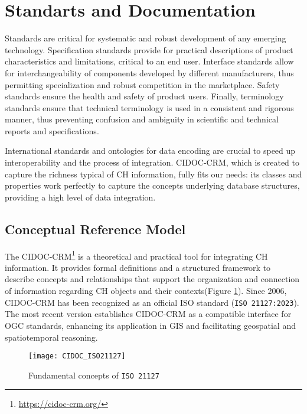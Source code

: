 \section{Standarts and Documentation} 
\label{sub:standart}

Standards are critical for systematic and robust development of any emerging technology. 
Specification standards provide for practical descriptions of product characteristics and limitations, 
critical to an end user. Interface standards allow for interchangeability of components developed by 
different manufacturers, thus permitting specialization and robust competition in the marketplace. 
Safety standards ensure the health and safety of product users. Finally, terminology standards ensure that 
technical terminology is used in a consistent and rigorous manner, thus preventing confusion and 
ambiguity in scientific and technical reports and specifications.
~\cite{hale2014handbook}

International standards and ontologies for data encoding are crucial
to speed up interoperability and the process of integration. \gls{CIDOC-CRM}, which is created to capture the richness typical of CH
information, fully fits our needs: its classes and properties
work perfectly to capture the concepts underlying database structures, providing a high level of data integration.
~\cite{eide2008encoding}



\subsection{ Conceptual Reference Model} 
\label{sec:cidoc}


The \gls{CIDOC-CRM}\footnote{\url{https://cidoc-crm.org/}} is a theoretical and practical tool for integrating \gls{CH} information. It provides formal definitions and a structured framework to describe concepts and relationships that support the organization and connection of information regarding \gls{CH} objects and their contexts(Figure \ref{fig:cidoc}).
Since 2006, \gls{CIDOC-CRM} has been recognized as an official ISO standard (\texttt{ISO 21127:2023}). The most recent version establishes \gls{CIDOC-CRM} as a compatible interface for \gls{OGC} standards, enhancing its application in \gls{GIS} and facilitating geospatial and spatiotemporal reasoning.


\begin{figure}[h!]
    \centering
    \texttt{[image: CIDOC\_ISO21127]}
    \caption{Fundamental concepts of \texttt{ISO 21127} ~\cite{doerr2007cidoc}}
    \label{fig:cidoc}
\end{figure}
\FloatBarrier

